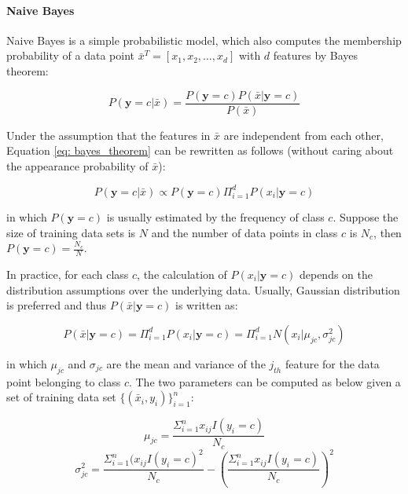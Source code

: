\paragraph{Naive Bayes} Naive Bayes is a simple probabilistic model, which also computes the membership probability of a data point $\bar{x}^T = [x_1, x_2, \dots, x_d]$ with $d$ features by Bayes theorem:

\begin{equation}\label{eq: bayes_theorem}
P(\textbf{y}=c|\bar{x}) = \frac{P(\textbf{y}=c)P(\bar{x}|\textbf{y}=c)}{P(\bar{x})}    
\end{equation}

Under the assumption that the features in $\bar{x}$ are independent from each other, Equation \ref{eq: bayes_theorem} can be rewritten as follows (without caring about the appearance probability of $\bar{x}$):

\begin{equation}\label{eq: nb_exp}
    P(\textbf{y}=c|\bar{x}) \propto P(\textbf{y}=c)\Pi_{i=1}^dP(x_i|\textbf{y}=c)
\end{equation}

in which $P(\textbf{y}=c)$ is usually estimated by the frequency of class $c$. Suppose the size of training data sets is $N$ and the number of data points in class $c$ is $N_c$, then $P(\textbf{y}=c) = \frac{N_c}{N}$.

In practice, for each class $c$, the calculation of $P(x_i|\textbf{y}=c)$ depends on the distribution assumptions over the underlying data. Usually, Gaussian distribution is preferred and thus $P(\bar{x}|\textbf{y}=c)$ is written as:

\begin{equation}\label{eq: nb_guassian}
    P(\bar{x}|\textbf{y}=c) = \Pi_{i=1}^dP(x_i|\textbf{y}=c) = \Pi_{i=1}^dN(x_i|\mu_{jc}, \sigma_{jc}^2)
\end{equation}

in which $\mu_{jc}$ and $\sigma_{jc}$ are the mean and variance of the $j_{th}$ feature for the data point belonging to class $c$. The two parameters can be computed as below given a set of training data set $\{(\bar{x}_i, y_i)\}_{i=1}^n$:

\begin{equation}\label{eq: nb_mean}
    \mu_{jc} = \frac{\Sigma_{i=1}^nx_{ij}I(y_i=c)}{N_c}
\end{equation}
\begin{equation}\label{eq: nb_var}
    \sigma_{jc}^2 = \frac{\Sigma_{i=1}^n(x_{ij}I(y_i=c)^2}{N_c}-(\frac{\Sigma_{i=1}^nx_{ij}I(y_i=c)}{N_c})^2
\end{equation}

